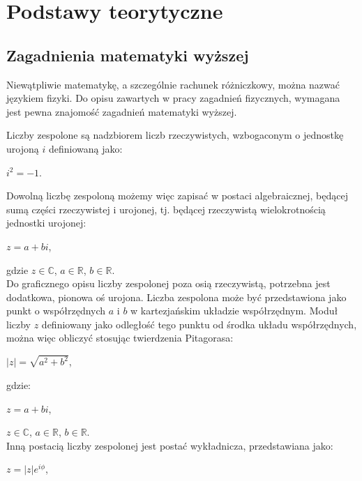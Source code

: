 \documentclass{SGGW-thesis}
\begin{document}
\chapter{Podstawy teorytyczne}
	\section{Zagadnienia matematyki wyższej}
	Niewątpliwie matematykę, a szczególnie rachunek różniczkowy, można nazwać językiem fizyki. Do opisu zawartych w pracy zagadnień fizycznych, wymagana jest pewna znajomość zagadnień matematyki wyższej.

	Liczby zespolone są nadzbiorem liczb rzeczywistych, wzbogaconym o jednostkę urojoną $i$ \cite{liczby zespolone}definiowaną jako: 
	
	\begin{center}
	$i^2=-1$.\\
	\end{center}
	
	Dowolną liczbę zespoloną możemy więc zapisać w postaci algebraicznej, będącej sumą części rzeczywistej i urojonej, tj. będącej rzeczywistą wielokrotnością jednostki urojonej:
	
	\begin{center}
	$z = a+bi$,
	\end{center}
	gdzie
	$z \in \mathbb{C}$,
	$a \in \mathbb{R}$,
	$b \in \mathbb{R}$.\\
	
	Do graficznego opisu liczby zespolonej poza osią rzeczywistą, potrzebna jest dodatkowa, pionowa oś urojona. Liczba zespolona może być przedstawiona jako punkt o współrzędnych $a$ i $b$ w kartezjańskim układzie współrzędnym. Moduł liczby $z$ definiowany jako odległość tego punktu od środka układu współrzędnych, można więc obliczyć stosując twierdzenia Pitagorasa:
	
	\begin{center}
	$|z| = \sqrt{a^2+b^2}$,
	\end{center}
	
	gdzie:
	
	$ z = a + bi$,
	
	$z \in \mathbb{C}$,
	$a \in \mathbb{R}$,
	$b \in \mathbb{R}$.\\
	
	Inną postacią liczby zespolonej jest postać wykładnicza, przedstawiana jako:
	
	\begin{center}
	$z = |z|e^{i\phi}$,
	\end{center}
	
\end{document}
